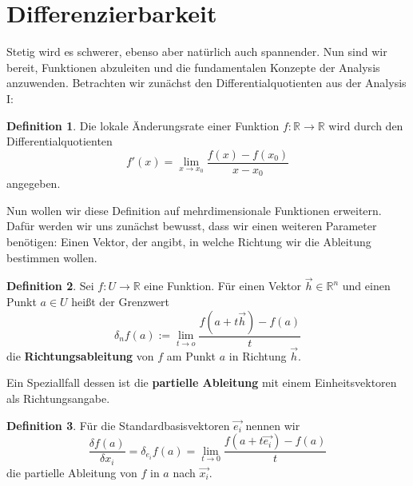 \documentclass[11pt,a4paper]{scrartcl}
\theoremstyle{remark}
\theoremstyle{definition}
\newtheorem{definition}{Definition}[section]
\begin{document}
\section{Differenzierbarkeit}
Stetig wird es schwerer, ebenso aber natürlich auch spannender. Nun sind wir bereit, Funktionen abzuleiten und die fundamentalen Konzepte der Analysis anzuwenden. Betrachten wir zunächst den Differentialquotienten aus der Analysis I:
\begin{definition}
Die lokale Änderungsrate einer Funktion $f: \mathbb{R} \to \mathbb{R}$ wird durch den Differentialquotienten
\[f'(x) = \lim _{x \to x_0} \frac{f(x) - f(x_0)}{x - x_0}\] angegeben.
\end{definition}
Nun wollen wir diese Definition auf mehrdimensionale Funktionen erweitern. Dafür werden wir uns zunächst bewusst, dass wir einen weiteren Parameter benötigen: Einen Vektor, der angibt, in welche Richtung wir die Ableitung bestimmen wollen.
\begin{definition}
Sei $f: U \to \mathbb{R}$ eine Funktion. Für einen Vektor $\vec{h} \in \mathbb{R}^{n}$ und einen Punkt $a \in U$ heißt der Grenzwert
\[\delta _{n} f(a) := \lim _{t \to o} \frac{f(a + t\vec{h}) - f(a)}{t}\] die \textbf{Richtungsableitung} von $f$ am Punkt $a$ in Richtung $\vec{h}$.
\end{definition}
Ein Speziallfall dessen ist die \textbf{partielle Ableitung} mit einem Einheitsvektoren als Richtungsangabe.
\begin{definition}
Für die Standardbasisvektoren $\vec{e_i}$ nennen wir 
\[\frac{\delta f(a)}{\delta x_i} = \delta _{e_i} f(a) = \lim _{t \to 0} \frac{f(a + t\vec{e_i}) - f(a)}{t}\]
die partielle Ableitung von $f$ in $a$ nach $\vec{x_i}$.
\end{definition}
\end{document}
